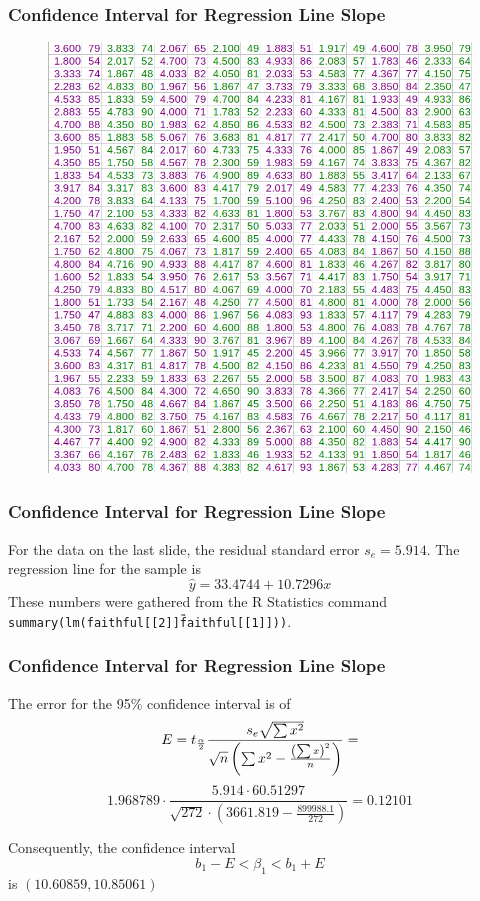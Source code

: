 \documentclass[xcolor=dvipsnames]{beamer}
\begin{document}
\begin{frame}
  \frametitle{Confidence Interval for Regression Line Slope}
\begin{figure}[h]
\includegraphics[scale=.35]{./diagrams/faithful.png}
\end{figure}
\end{frame}

\begin{frame}
  \frametitle{Confidence Interval for Regression Line Slope}
  For the data on the last slide, the residual standard error
  $s_{e}=5.914$. The regression line for the sample is
  \begin{equation}
    \label{eq:eiheelut}
    \hat{y}=33.4744+10.7296x
  \end{equation}
These numbers were gathered from the R Statistics command
\texttt{summary(lm(faithful[[2]]\~faithful[[1]]))}. 
\end{frame}

\begin{frame}
  \frametitle{Confidence Interval for Regression Line Slope}
  The error for the 95\% confidence interval is
  of 
\begin{equation}
  \label{eq:gaeyiegh}
E=t_{\frac{\alpha}{2}}\frac{s_{e}\sqrt{\sum{}x^{2}}}{\sqrt{n}\left(\sum{}x^{2}-\frac{\left(\sum{}x\right)^{2}}{n}\right)}=\notag
\end{equation}
\begin{equation}
  \label{eq:eevievuo}
  1.968789\cdot\frac{5.914\cdot{}60.51297}{\sqrt{272}\cdot\left(3661.819-\frac{899988.1}{272}\right)}=0.12101
\end{equation}

Consequently, the confidence interval
\begin{equation}
  \label{eq:sahshixu}
  b_{1}-E<\beta_{1}<b_{1}+E
\end{equation}
is $(10.60859,10.85061)$
\end{frame}
\end{document}

